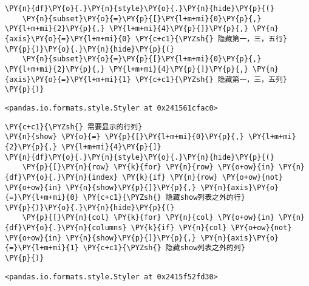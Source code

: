     \begin{tcolorbox}[breakable, size=fbox, boxrule=1pt, pad at break*=1mm,colback=cellbackground, colframe=cellborder]
\begin{Verbatim}[commandchars=\\\{\}]
\PY{n}{df}\PY{o}{.}\PY{n}{style}\PY{o}{.}\PY{n}{hide}\PY{p}{(}
    \PY{n}{subset}\PY{o}{=}\PY{p}{[}\PY{l+m+mi}{0}\PY{p}{,} \PY{l+m+mi}{2}\PY{p}{,} \PY{l+m+mi}{4}\PY{p}{]}\PY{p}{,} \PY{n}{axis}\PY{o}{=}\PY{l+m+mi}{0} \PY{c+c1}{\PYZsh{} 隐藏第一，三，五行}
\PY{p}{)}\PY{o}{.}\PY{n}{hide}\PY{p}{(}
    \PY{n}{subset}\PY{o}{=}\PY{p}{[}\PY{l+m+mi}{0}\PY{p}{,} \PY{l+m+mi}{2}\PY{p}{,} \PY{l+m+mi}{4}\PY{p}{]}\PY{p}{,} \PY{n}{axis}\PY{o}{=}\PY{l+m+mi}{1} \PY{c+c1}{\PYZsh{} 隐藏第一，三，五列}
\PY{p}{)}
\end{Verbatim}
\end{tcolorbox}

            \begin{tcolorbox}[breakable, size=fbox, boxrule=.5pt, pad at break*=1mm, opacityfill=0]
\begin{Verbatim}[commandchars=\\\{\}]
<pandas.io.formats.style.Styler at 0x241561cfac0>
\end{Verbatim}
\end{tcolorbox}
        
    \begin{tcolorbox}[breakable, size=fbox, boxrule=1pt, pad at break*=1mm,colback=cellbackground, colframe=cellborder]
\begin{Verbatim}[commandchars=\\\{\}]
\PY{c+c1}{\PYZsh{} 需要显示的行列}
\PY{n}{show} \PY{o}{=} \PY{p}{[}\PY{l+m+mi}{0}\PY{p}{,} \PY{l+m+mi}{2}\PY{p}{,} \PY{l+m+mi}{4}\PY{p}{]}
\PY{n}{df}\PY{o}{.}\PY{n}{style}\PY{o}{.}\PY{n}{hide}\PY{p}{(}
    \PY{p}{[}\PY{n}{row} \PY{k}{for} \PY{n}{row} \PY{o+ow}{in} \PY{n}{df}\PY{o}{.}\PY{n}{index} \PY{k}{if} \PY{n}{row} \PY{o+ow}{not} \PY{o+ow}{in} \PY{n}{show}\PY{p}{]}\PY{p}{,} \PY{n}{axis}\PY{o}{=}\PY{l+m+mi}{0} \PY{c+c1}{\PYZsh{} 隐藏show列表之外的行}
\PY{p}{)}\PY{o}{.}\PY{n}{hide}\PY{p}{(}
    \PY{p}{[}\PY{n}{col} \PY{k}{for} \PY{n}{col} \PY{o+ow}{in} \PY{n}{df}\PY{o}{.}\PY{n}{columns} \PY{k}{if} \PY{n}{col} \PY{o+ow}{not} \PY{o+ow}{in} \PY{n}{show}\PY{p}{]}\PY{p}{,} \PY{n}{axis}\PY{o}{=}\PY{l+m+mi}{1} \PY{c+c1}{\PYZsh{} 隐藏show列表之外的列}
\PY{p}{)}
\end{Verbatim}
\end{tcolorbox}

            \begin{tcolorbox}[breakable, size=fbox, boxrule=.5pt, pad at break*=1mm, opacityfill=0]
\begin{Verbatim}[commandchars=\\\{\}]
<pandas.io.formats.style.Styler at 0x2415f52fd30>
\end{Verbatim}
\end{tcolorbox}